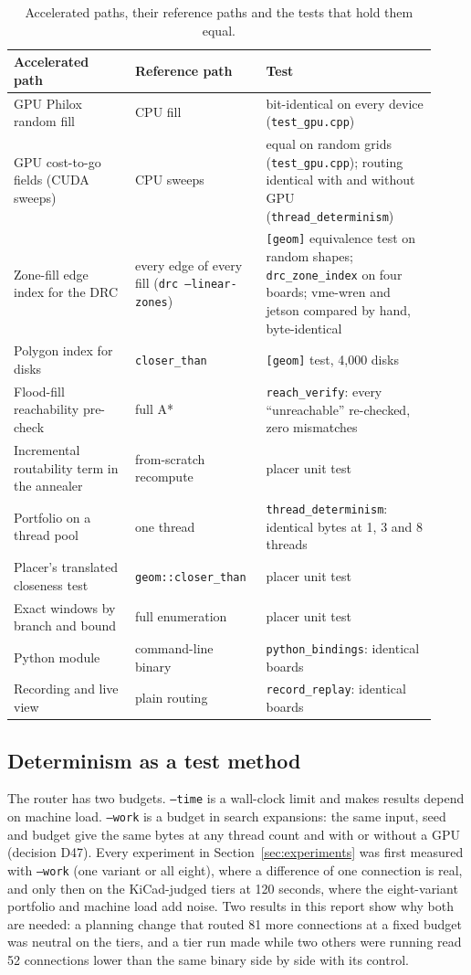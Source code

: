 \documentclass[10pt,a4paper]{article}
\newcommand{\code}[1]{\texttt{#1}}
\begin{document}
\begin{table}[H]
\centering\small
\begin{tabular}{@{}p{0.27\linewidth}p{0.27\linewidth}p{0.38\linewidth}@{}}
\toprule
Accelerated path & Reference path & Test \\
\midrule
GPU Philox random fill & CPU fill & bit-identical on every device (\code{test\_gpu.cpp}) \\
GPU cost-to-go fields (CUDA sweeps) & CPU sweeps & equal on random grids (\code{test\_gpu.cpp}); routing identical with and without GPU (\code{thread\_determinism}) \\
Zone-fill edge index for the DRC & every edge of every fill (\code{drc --linear-zones}) & \code{[geom]} equivalence test on random shapes; \code{drc\_zone\_index} on four boards; vme-wren and jetson compared by hand, byte-identical \\
Polygon index for disks & \code{closer\_than} & \code{[geom]} test, 4,000 disks \\
Flood-fill reachability pre-check & full A* & \code{reach\_verify}: every ``unreachable'' re-checked, zero mismatches \\
Incremental routability term in the annealer & from-scratch recompute & placer unit test \\
Portfolio on a thread pool & one thread & \code{thread\_determinism}: identical bytes at 1, 3 and 8 threads \\
Placer's translated closeness test & \code{geom::closer\_than} & placer unit test \\
Exact windows by branch and bound & full enumeration & placer unit test \\
Python module & command-line binary & \code{python\_bindings}: identical boards \\
Recording and live view & plain routing & \code{record\_replay}: identical boards \\
\bottomrule
\end{tabular}
\caption{Accelerated paths, their reference paths and the tests that hold them equal.}
\label{tab:equiv}
\end{table}

\subsection{Determinism as a test method}

The router has two budgets. \code{--time} is a wall-clock limit and makes results depend on machine load.
\code{--work} is a budget in search expansions: the same input, seed and budget give the same bytes at any
thread count and with or without a GPU (decision D47). Every experiment in Section~\ref{sec:experiments} was first
measured with \code{--work} (one variant or all eight), where a difference of one connection is real, and only
then on the KiCad-judged tiers at 120 seconds, where the eight-variant portfolio and machine load add noise. Two
results in this report show why both are needed: a planning change that routed 81 more connections at a fixed
budget was neutral on the tiers, and a tier run made while two others were running read 52 connections lower
than the same binary side by side with its control.
\end{document}
